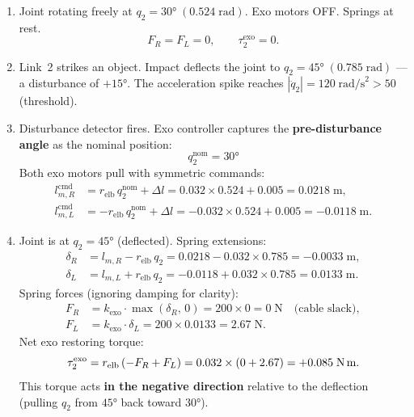 \documentclass[11pt, a4paper]{article}
\begin{document}
\begin{enumerate}
    \item[\textbf{T$_0$}:]
        Joint rotating freely at $q_2 = 30°\;(0.524\;\text{rad})$.
        Exo motors OFF.  Springs at rest.
        \[
            F_R = F_L = 0, \qquad \tau_2^{\text{exo}} = 0.
        \]

    \item[\textbf{T$_1$}:]
        Link~2 strikes an object.  Impact deflects the joint to
        $q_2 = 45°\;(0.785\;\text{rad})$ --- a disturbance of $+15°$.
        The acceleration spike reaches $|\ddot{q}_2| = 120\;\text{rad/s}^2
        > 50$ (threshold).

    \item[\textbf{T$_2$}:]
        Disturbance detector fires.  Exo controller captures the
        \textbf{pre-disturbance angle} as the nominal position:
        \[
            \boxed{q_2^{\text{nom}} = 30°}
        \]
        Both exo motors pull with symmetric commands:
        \begin{align}
            l_{m,R}^{\text{cmd}} &= r_{\text{elb}}\,q_2^{\text{nom}} + \Delta l
                = 0.032 \times 0.524 + 0.005
                = 0.0218\;\text{m}, \\
            l_{m,L}^{\text{cmd}} &= -r_{\text{elb}}\,q_2^{\text{nom}} + \Delta l
                = -0.032 \times 0.524 + 0.005
                = -0.0118\;\text{m}.
        \end{align}

    \item[\textbf{T$_3$}:]
        Joint is at $q_2 = 45°$ (deflected).  Spring extensions:
        \begin{align}
            \delta_R &= l_{m,R} - r_{\text{elb}}\,q_2
                     = 0.0218 - 0.032 \times 0.785 = -0.0033\;\text{m}, \\
            \delta_L &= l_{m,L} + r_{\text{elb}}\,q_2
                     = -0.0118 + 0.032 \times 0.785 = 0.0133\;\text{m}.
        \end{align}
        Spring forces (ignoring damping for clarity):
        \begin{align}
            F_R &= k_{\text{exo}} \cdot \max(\delta_R,\, 0) = 200 \times 0 = 0\;\text{N}
                   \quad \text{(cable slack)}, \\
            F_L &= k_{\text{exo}} \cdot \delta_L = 200 \times 0.0133 = 2.67\;\text{N}.
        \end{align}
        Net exo restoring torque:
        \[
            \tau_2^{\text{exo}} = r_{\text{elb}}\,(-F_R + F_L)
            = 0.032 \times (0 + 2.67)
            = +0.085\;\text{N\,m}.
        \]
        This torque acts \textbf{in the negative direction} relative to the
        deflection (pulling $q_2$ from $45°$ back toward $30°$).


\end{enumerate}
\end{document}
